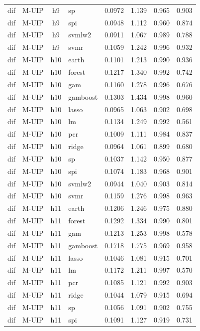 \begin{ThreePartTable}
\begin{longtable}[t]{llclcccc}
dif & M-UIP & h9 & sp & 0.0972 & 1.139 & 0.965 & 0.903\\
dif & M-UIP & h9 & spi & 0.0948 & 1.112 & 0.960 & 0.874\\
dif & M-UIP & h9 & svmlw2 & 0.0911 & 1.067 & 0.989 & 0.788\\
dif & M-UIP & h9 & svmr & 0.1059 & 1.242 & 0.996 & 0.932\\
\addlinespace
dif & M-UIP & h10 & earth & 0.1101 & 1.213 & 0.990 & 0.936\\
dif & M-UIP & h10 & forest & 0.1217 & 1.340 & 0.992 & 0.742\\
dif & M-UIP & h10 & gam & 0.1160 & 1.278 & 0.996 & 0.676\\
dif & M-UIP & h10 & gamboost & 0.1303 & 1.434 & 0.998 & 0.960\\
dif & M-UIP & h10 & lasso & 0.0965 & 1.063 & 0.902 & 0.698\\
dif & M-UIP & h10 & lm & 0.1134 & 1.249 & 0.992 & 0.561\\
dif & M-UIP & h10 & pcr & 0.1009 & 1.111 & 0.984 & 0.837\\
dif & M-UIP & h10 & ridge & 0.0964 & 1.061 & 0.899 & 0.680\\
dif & M-UIP & h10 & sp & 0.1037 & 1.142 & 0.950 & 0.877\\
dif & M-UIP & h10 & spi & 0.1074 & 1.183 & 0.968 & 0.901\\
dif & M-UIP & h10 & svmlw2 & 0.0944 & 1.040 & 0.903 & 0.814\\
dif & M-UIP & h10 & svmr & 0.1159 & 1.276 & 0.998 & 0.963\\
\addlinespace
dif & M-UIP & h11 & earth & 0.1206 & 1.246 & 0.975 & 0.880\\
dif & M-UIP & h11 & forest & 0.1292 & 1.334 & 0.990 & 0.801\\
dif & M-UIP & h11 & gam & 0.1213 & 1.253 & 0.998 & 0.578\\
dif & M-UIP & h11 & gamboost & 0.1718 & 1.775 & 0.969 & 0.958\\
dif & M-UIP & h11 & lasso & 0.1046 & 1.081 & 0.915 & 0.701\\
dif & M-UIP & h11 & lm & 0.1172 & 1.211 & 0.997 & 0.570\\
dif & M-UIP & h11 & pcr & 0.1085 & 1.121 & 0.992 & 0.903\\
dif & M-UIP & h11 & ridge & 0.1044 & 1.079 & 0.915 & 0.694\\
dif & M-UIP & h11 & sp & 0.1056 & 1.091 & 0.902 & 0.755\\
dif & M-UIP & h11 & spi & 0.1091 & 1.127 & 0.919 & 0.731\\

\end{longtable}
\end{ThreePartTable}
